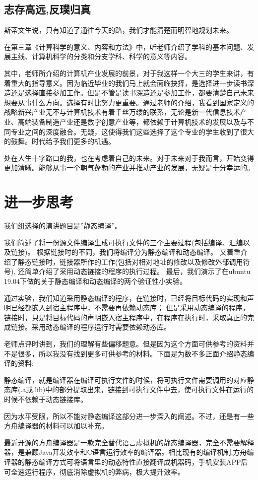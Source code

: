 \documentclass{article}
\begin{document}
\subsection{志存高远,反璞归真}
斯蒂文生说，只有知道了通往今天的路，我们才能清楚而明智地规划未来。\par
在第三章《计算科学的意义、内容和方法》中，听老师介绍了学科的基本问题、发展主线、计算机科学的分类和分支学科、科学的意义等内容。\par
其中，老师所介绍的计算机产业发展的前景，对于我这样一个大三的学生来讲，有着重大的指导意义。因为临近毕业的我们马上就会面临抉择，是选择进一步读书深造还是选择直接参加工作。但是不管是读书深造还是参加工作，都要清楚自己未来想要从事什么方向。选择有时比努力更重要。通过老师的介绍，我看到国家定义的战略新兴产业无不与计算机技术有着千丝万缕的联系，无论是新一代信息技术产业、高端装备制造产业还是数字创意产业等，都依赖于计算机技术的发展以及与不同专业之间的深度融合。无疑，这使得我们这些选择了这个专业的学生收到了很大的鼓舞。时代给予我们更多的机遇。\par
处在人生十字路口的我，也在考虑着自己的未来。对于未来对于我而言，开始变得更加清晰。能够从事一个朝气蓬勃的产业并推动产业的发展，无疑是十分幸运的。\par 
\section{进一步思考}
我们组选择的演讲题目是”静态编译”。\par
我们简述了将一份源文件编译生成可执行文件的三个主要过程(包括编译、汇编以及链接)。
根据链接时的不同，我们将编译分为静态编译和动态编译。
又着重介绍了静态链接时，链接器所作的工作(包括对相对地址的修改以及修改外部调用符号), 还简单介绍了采用动态链接的程序的执行过程。
最后，我们演示了在ubuntu 19.04下做的关于静态编译和动态编译的两个验证性小实验。\par
通过实验，我们知道采用静态编译的程序，在链接时，已经将目标代码的实现和声明已经都嵌入到宿主程序中，不需要再依赖动态库；
但是采用动态编译的程序，链接时，只是将目标代码的声明嵌入宿主程序中，在程序在执行时，采取真正的完成链接。采用动态编译的程序运行时需要依赖动态库。\par
老师点评时讲到，我们的理解有些偏移题意。但是因为这个方面可供参考的资料并不是很多，所以我没有找到更多可供参考的材料。下面是为数不多正面介绍静态编译的资料:\par
静态编译，就是编译器在编译可执行文件的时候，将可执行文件需要调用的对应静态库(.a或.lib)中的部分提取出来，链接到可执行文件中去，使可执行文件在运行的时候不依赖于动态链接库。\par
因为水平受限，所以不能对静态编译这部分进一步深入的阐述。不过，还是有一些方舟编译器的材料可以加以补充。\par
最近开源的方舟编译器是一款完全替代语言虚拟机的静态编译器，完全不需要解释器，是兼顾Java开发效率和C语言运行效率的编译器。相比现有的编译机制,方舟编译器的静态编译方式可将语言里的动态特性直接翻译成机器码，手机安装APP后可全速运行程序，彻底消除虚拟机的弊病，极大提升效率。
\end{document}
